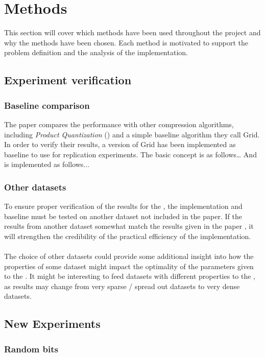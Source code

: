 \section{Methods}
\label{methods}
This section will cover which methods have been used throughout the project and why the methods have been chosen. Each method is motivated to support the problem definition and the analysis of the \qs{} implementation. 

\subsection{Experiment verification}

\subsubsection{Baseline comparison}
The paper compares the \qs{} performance with other compression algorithms, including \textit{Product Quantization} (\pq{}) and a simple baseline algorithm they call Grid. In order to verify their results, a version of Grid has been implemented as baseline to use for replication experiments. The basic concept is as follows… And is implemented as follows...

\subsubsection{Other datasets}
To ensure proper verification of the results for the \qs{}, the implementation and baseline must be tested on another dataset not included in the paper. If the results from another dataset somewhat match the results given in the paper \cite{wagner17}, it will strengthen the credibility of the practical efficiency of the \qs{} implementation.
\\
\\
The choice of other datasets could provide some additional insight into how the properties of some dataset might impact the optimality of the parameters given to the \qs{}. It might be interesting to feed datasets with different properties to the \qs{}, as results may change from very sparse / spread out datasets to very dense datasets.

\subsection{New Experiments}

\subsubsection{Random bits}


